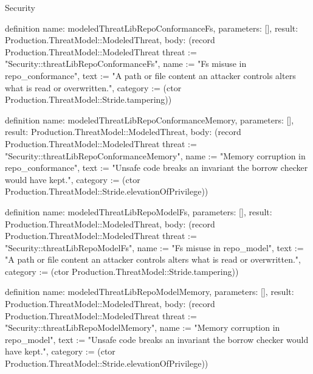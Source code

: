 \begin{lexlean}{Security}
\begin{semanticmodule}
definition{
  name: modeledThreatLibRepoConformanceFs,
  parameters: [],
  result: Production.ThreatModel::ModeledThreat,
  body: (record Production.ThreatModel::ModeledThreat {threat := "Security::threatLibRepoConformanceFs", name := "Fs misuse in repo_conformance", text := "A path or file content an attacker controls alters what is read or overwritten.", category := (ctor Production.ThreatModel::Stride.tampering)})
}

definition{
  name: modeledThreatLibRepoConformanceMemory,
  parameters: [],
  result: Production.ThreatModel::ModeledThreat,
  body: (record Production.ThreatModel::ModeledThreat {threat := "Security::threatLibRepoConformanceMemory", name := "Memory corruption in repo_conformance", text := "Unsafe code breaks an invariant the borrow checker would have kept.", category := (ctor Production.ThreatModel::Stride.elevationOfPrivilege)})
}

definition{
  name: modeledThreatLibRepoModelFs,
  parameters: [],
  result: Production.ThreatModel::ModeledThreat,
  body: (record Production.ThreatModel::ModeledThreat {threat := "Security::threatLibRepoModelFs", name := "Fs misuse in repo_model", text := "A path or file content an attacker controls alters what is read or overwritten.", category := (ctor Production.ThreatModel::Stride.tampering)})
}

definition{
  name: modeledThreatLibRepoModelMemory,
  parameters: [],
  result: Production.ThreatModel::ModeledThreat,
  body: (record Production.ThreatModel::ModeledThreat {threat := "Security::threatLibRepoModelMemory", name := "Memory corruption in repo_model", text := "Unsafe code breaks an invariant the borrow checker would have kept.", category := (ctor Production.ThreatModel::Stride.elevationOfPrivilege)})
}


\end{semanticmodule}
\end{lexlean}
